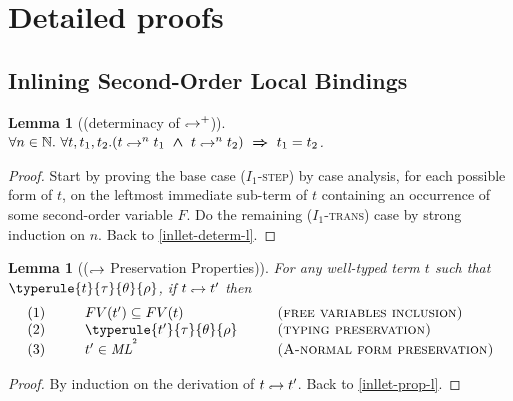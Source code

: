 \documentclass[a4paper,11pt,oneside]{article}
\theoremstyle{plain}
\newtheorem{lemma}[definition]{Lemma}
\newcommand{\bwedge}{\boldsymbol{~\wedge~}}
\newcommand{\brarr}{\boldsymbol{~\Rightarrow~}}
\newcommand{\inlsrc}{\textit{ML}^{^2}}
\newcommand{\inlT}{\inlsrc}
\newcommand{\hookdownarrow}{\mathrel{\rotatebox[origin=c]{180}{$\hookleftarrow$}}}
\newcommand{\inlletarr}{\hookdownarrow}
\newcommand{\inlletplus}{\hookdownarrow^{+}}
\newcommand{\inllet}[2]{#1 \hookdownarrow #2}
\begin{document}
\section{Detailed proofs} 


	\subsection{Inlining Second-Order Local Bindings}
	

\begin{lemma}[(determinacy of $\inlletplus$)] 
	$\forall n \in \mathbb{N}.~ \forall t, t_1, t_2.
		(t \inlletarr^{n} {t_1} \bwedge t \inlletarr^{n} {t_2}) \brarr
			t_1 = t_2$.	
	\label{inllet-determ-p}	
\end{lemma}

\begin{proof}
Start by proving the base case (\textsc{$I_1$-step}) by case analysis, for each possible form of $t$, on the leftmost immediate sub-term of $t$ containing an occurrence of some second-order variable $F$. 
	  Do the remaining  (\textsc{$I_1$-trans}) case	by strong induction on $n$.  Back to \ref{inllet-determ-l}.
\end{proof}	
	
\begin{lemma}[($\inlletarr$ Preservation Properties)]
For any well-typed term $t$ such that\\ $\typerule{t}{\tau}{\theta}{\rho}$, if $\inllet{t}{t'}$ then
\begin{displaymath}
\begin{array}{l@{\hspace*{1cm}}l@{\hspace*{1cm}}l}
	(1)& FV(t') \subseteq FV(t) & \textsc{(free variables inclusion)} \\
	(2)& \typerule{t'}{\tau}{\theta}{\rho} &\textsc{(typing preservation)} \\
	(3)& t' \in \inlT & \textsc{(A-normal form preservation)}
\end{array}
\end{displaymath}
 \label{inllet-prop-p}
\end{lemma}

\begin{proof}
 By induction on the derivation of $\inllet{t}{t'}$.
 \label{TODO-inllet-prop-p}
 Back to \ref{inllet-prop-l}.
 \end{proof}	
	
\end{document}
